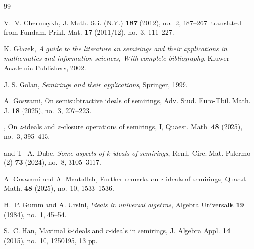 \documentclass[11pt,leqno]{amsart}
\theoremstyle{definition}
\numberwithin{equation}{section}
\begin{document}
\begin{thebibliography}{99}
	
	
	
	

 V.~V. Chermnykh, J. Math. Sci. (N.Y.) {\bf 187} (2012), no.~2, 187--267; translated from Fundam. Prikl. Mat. {\bf 17} (2011/12), no.~3, 111--227.
    
 K. G\l azek, \textit{A guide to the literature on semirings and their applications in mathematics and information sciences, With complete bibliography}, Kluwer Academic Publishers, 2002.

 J. S. Golan, \textit{Semirings and their applications}, Springer, 1999.

 A. Goswami, On semisubtractive ideals of semirings, Adv. Stud. Euro-Tbil. Math. J. {\bf 18} (2025), no.~3, 207--223.

 \bysame, On $z$-ideals and $z$-closure operations of semirings, I, Quaest. Math. {\bf 48} (2025), no.~3, 395--415.

 \bysame and T.~A. Dube, \textit{Some aspects of $k$-ideals of semirings}, Rend. Circ. Mat. Palermo (2) {\bf 73} (2024), no.~8, 3105--3117.


 A. Goswami and A. Maatallah, Further remarks on $z$-ideals of semirings, Quaest. Math. {\bf 48} (2025), no.~10, 1533--1536.

 H.~P. Gumm and A. Ursini, \textit{Ideals in universal algebras}, Algebra Universalis {\bf 19} (1984), no.~1, 45--54.

 S.~C. Han, Maximal $k$-ideals and $r$-ideals in semirings, J. Algebra Appl. {\bf 14} (2015), no.~10, 1250195, 13 pp.


\end{thebibliography}
\end{document}
